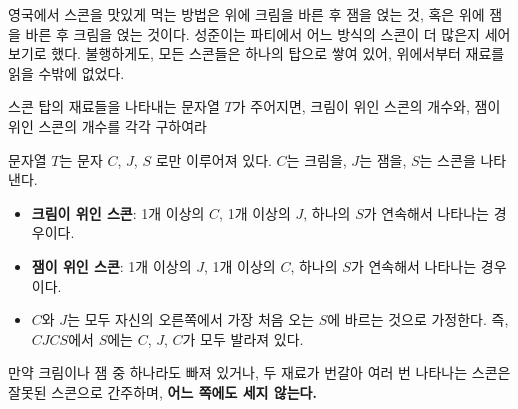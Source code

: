 영국에서 스콘을 맛있게 먹는 방법은 위에 크림을 바른 후 잼을 얹는 것, 혹은 위에 잼을 바른 후 크림을 얹는 것이다. 성준이는 파티에서 어느 방식의 스콘이 더 많은지 세어 보기로 했다. 불행하게도, 모든 스콘들은 하나의 탑으로 쌓여 있어, 위에서부터 재료를 읽을 수밖에 없었다.

스콘 탑의 재료들을 나타내는 문자열 $T$가 주어지면, 크림이 위인 스콘의 개수와, 잼이 위인 스콘의 개수를 각각 구하여라

문자열 $T$는 문자 $C$, $J$, $S$ 로만 이루어져 있다. $C$는 크림을, $J$는 잼을, $S$는 스콘을 나타낸다.

\begin{itemize}
  \item \textbf{크림이 위인 스콘}: 1개 이상의 $C$, 1개 이상의 $J$, 하나의 $S$가 연속해서 나타나는 경우이다.
  \item \textbf{잼이 위인 스콘}: 1개 이상의 $J$, 1개 이상의 $C$, 하나의 $S$가 연속해서 나타나는 경우이다.
  \item $C$와 $J$는 모두 자신의 오른쪽에서 가장 처음 오는 $S$에 바르는 것으로 가정한다. 즉, $CJCS$에서 $S$에는 $C$, $J$, $C$가 모두 발라져 있다.
\end{itemize}

만약 크림이나 잼 중 하나라도 빠져 있거나, 두 재료가 번갈아 여러 번 나타나는 스콘은 잘못된 스콘으로 간주하며, \textbf{어느 쪽에도 세지 않는다.}

